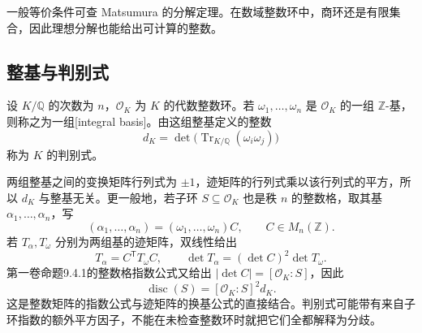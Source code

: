 一般等价条件可查 Matsumura 的分解定理\cite[Theorem 11.6, pp. 82--84]{Matsumura1989CommutativeRingTheory}。在数域整数环中，商环还是有限集合，因此理想分解也能给出可计算的整数。

\subsection{整基与判别式}
\label{b3:subsec:A02:02}

\begin{definition}\label{b3:def:integer-discriminant-norm}
	设 \(K/\mathbb Q\) 的次数为 \(n\)，\(\mathcal O_K\) 为 \(K\) 的代数整数环。若 \(\omega_1,\ldots,\omega_n\) 是 \(\mathcal O_K\) 的一组 \(\mathbb Z\)-基，则称之为一组[integral basis]。由这组整基定义的整数
	\[
		d_K=\det\bigl(\operatorname{Tr}_{K/\mathbb Q}(\omega_i\omega_j)\bigr)
	\]
	称为 \(K\) 的判别式。
\end{definition}

两组整基之间的变换矩阵行列式为 \(\pm1\)，迹矩阵的行列式乘以该行列式的平方，所以 \(d_K\) 与整基无关。更一般地，若子环 \(S\subseteq\mathcal O_K\) 也是秩 \(n\) 的整数格，取其基 \(\alpha_1,\ldots,\alpha_n\)，写
\[
	(\alpha_1,\ldots,\alpha_n)=(\omega_1,\ldots,\omega_n)C, \qquad C\in M_n(\mathbb Z).
\]
若 \(T_\alpha,T_\omega\) 分别为两组基的迹矩阵，双线性给出
\[
	T_\alpha=C^{\mathsf T}T_\omega C,\qquad \det T_\alpha=(\det C)^2\det T_\omega.
\]
第一卷命题9.4.1的整数格指数公式又给出 \(|\det C|=[\mathcal O_K:S]\)，因此
\[
	\operatorname{disc}(S)=[\mathcal O_K:S]^2d_K.
\]
这是整数矩阵的指数公式与迹矩阵的换基公式的直接结合。判别式可能带有来自子环指数的额外平方因子，不能在未检查整数环时就把它们全都解释为分歧。

